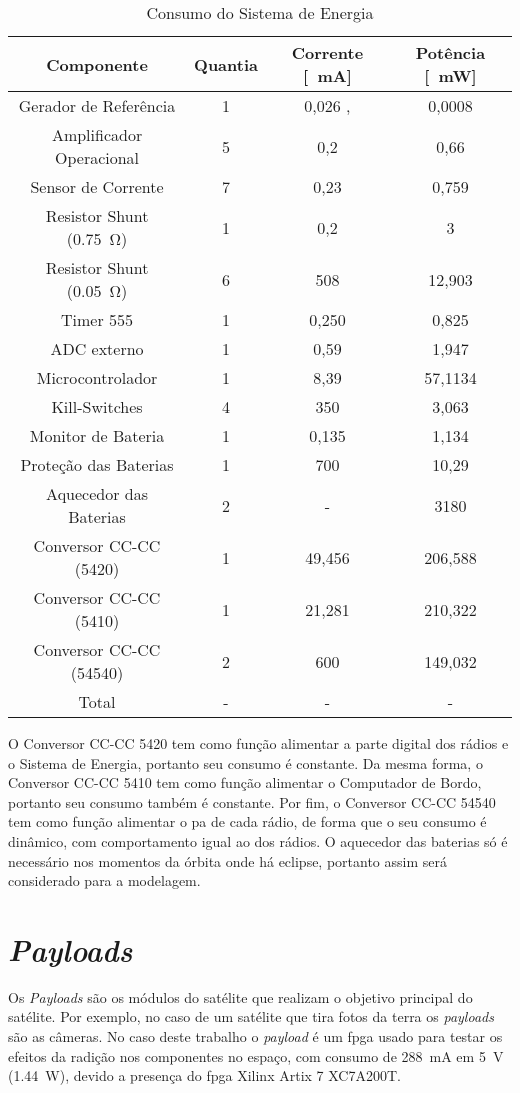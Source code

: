 \begin{table}[!htpb]
\centering
\begin{tabular}{c c c c}
\\ \hline
Componente & Quantia & Corrente [\SI{}{\milli\ampere}] & Potência [\SI{}{\milli\watt}] \\ \hline \hline
Gerador de Referência & 1 & 0,026 \cite{ref5030}, \cite{msp430f6659} & 0,0008 \cite{ref5030} \\
Amplificador Operacional & 5 & 0,2 \cite{tlv341} & 0,66 \\
Sensor de Corrente & 7 & 0,23 \cite{max9934} & 0,759 \\
Resistor Shunt (\SI{0,75}{\ohm}) & 1 & 0,2 & 3 \\
Resistor Shunt (\SI{0,05}{\ohm}) & 6 & 508 & 12,903 \\
Timer 555 & 1 & 0,250 \cite{lmc555} & 0,825 \\
ADC externo & 1 & 0,59 \cite{ads1248} & 1,947 \\
Microcontrolador & 1 & 8,39 \cite{msp430f6659} & 57,1134 \cite{msp430f6659} \\
Kill-Switches & 4 & 350 & 3,063 \cite{si4403} \\
Monitor de Bateria & 1 & 0,135 \cite{ds2775} & 1,134 \cite{ds2775} \\
Proteção das Baterias & 1 & 700 & 10,29 \cite{fds6898az} \\
Aquecedor das Baterias & 2 & - & 3180\\
Conversor CC-CC (5420) & 1 & 49,456 & 206,588 \cite{tps5420} \\
Conversor CC-CC (5410) & 1 & 21,281 & 210,322 \cite{tps5410} \\
Conversor CC-CC (54540) & 2 & 600 & 149,032 \cite{tps54540} \\ \hline
Total & - & - & - \\ \hline
\end{tabular}
\caption{Consumo do Sistema de Energia}
\label{consumo_eps}
\end{table}

O Conversor CC-CC 5420 tem como função alimentar a parte digital dos rádios e o Sistema de Energia, portanto seu consumo é constante. Da mesma forma, o Conversor CC-CC 5410 tem como função alimentar o Computador de Bordo, portanto seu consumo também é constante. Por fim, o Conversor CC-CC 54540 tem como função alimentar o \gls{pa} de cada rádio, de forma que o seu consumo é dinâmico, com comportamento igual ao dos rádios. O aquecedor das baterias só é necessário nos momentos da órbita onde há eclipse, portanto assim será considerado para a modelagem.

\section{\textit{Payloads}}

Os \textit{Payloads} são os módulos do satélite que realizam o objetivo principal do satélite. Por exemplo, no caso de um satélite que tira fotos da terra os \textit{payloads} são as câmeras. No caso deste trabalho o \textit{payload} é um \gls{fpga} usado para testar os efeitos da radição nos componentes no espaço, com consumo de \SI{288}{\milli\ampere} em \SI{5}{\volt} (\SI{1,44}{\watt}), devido a presença do \gls{fpga} Xilinx Artix 7 XC7A200T.